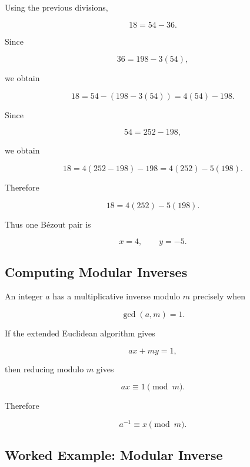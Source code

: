 Using the previous divisions,

\[ 18=54-36. \]

Since

\[ 36=198-3(54), \]

we obtain

\[ 18=54-(198-3(54))=4(54)-198. \]

Since

\[ 54=252-198, \]

we obtain

\[ 18=4(252-198)-198=4(252)-5(198). \]

Therefore

\[ \boxed{18=4(252)-5(198).} \]

Thus one Bézout pair is

\[ x=4,\qquad y=-5. \]

\subsection{Computing Modular Inverses}
\label{subsec:computing-modular-inverses}

An integer \(a\) has a multiplicative inverse modulo \(m\) precisely when

\[ \gcd(a,m)=1. \]

If the extended Euclidean algorithm gives

\[ ax+my=1, \]

then reducing modulo \(m\) gives

\[ ax\equiv1\pmod m. \]

Therefore

\[ \boxed{a^{-1}\equiv x\pmod m.} \]

\subsection{Worked Example: Modular Inverse}
\label{subsec:worked-modular-inverse}

